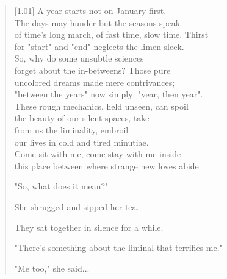 \begin{verse}[1.01\textwidth]
A year starts not on January first.\\
\vin The days may hunder but the seasons speak\\
of time's long march, of fast time, slow time. Thirst\\
\vin for "start" and "end" neglects the limen sleek.\\
So, why do some unsubtle sciences\\
\vin forget about the in-betweens? Those pure\\
uncolored dreams made mere contrivances;\\
\vin "between the years" now simply: "year, then year".\\
These rough mechanics, held unseen, can spoil\\
\vin the beauty of our silent spaces, take\\
from us the liminality, embroil\\
\vin our lives in cold and tired minutiae.\\
\vin \vin Come sit with me, come stay with me inside\\
\vin \vin this place between where strange new loves abide

\secdiv

"So, what does it mean?"

She shrugged and sipped her tea.

They sat together in silence for a while.

"There's something about the liminal that terrifies me."

\hfill "Me too," she said...
\end{verse}

